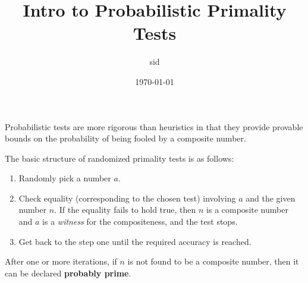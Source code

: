\documentclass{article}
\title{Intro to Probabilistic Primality Tests}
\author{sid}
\date{\today}
\newcommand{\bld}[1]{\textbf{#1}}
\newcommand{\itl}[1]{\textit{#1}}
\begin{document}
\maketitle

Probabilistic tests are more rigorous than heuristics in that they provide provable bounds on the probability of being fooled by a composite number.

\vspace*{0.8em}

The basic structure of randomized primality tests is as follows:

\begin{enumerate}
  \item Randomly pick a number $a$.
  \item Check equality (corresponding to the chosen test) involving $a$ and the given number $n$. If the equality fails to hold true, then $n$ is a composite number and $a$ is a \itl{witness} for the compositeness, and the test stops.
  \item Get back to the step one until the required accuracy is reached.
\end{enumerate}

After one or more iterations, if $n$ is not found to be a composite number, then it can be declared \bld{probably prime}.
\end{document}
